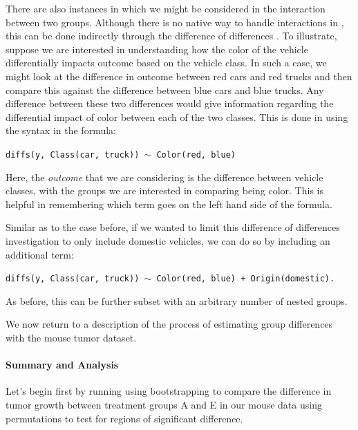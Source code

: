 There are also instances in which we might be considered in the interaction between two groups. Although there is no native way to handle interactions in , this can be done indirectly through the difference of differences \citep{McMurray2019}. To illustrate, suppose we are interested in understanding how the color of the vehicle differentially impacts outcome based on the vehicle class. In such a case, we might look at the difference in outcome between red cars and red trucks and then compare this against the difference between blue cars and blue trucks. Any difference between these two differences would give information regarding the differential impact of color between each of the two classes. This is done in  using the  syntax in the formula:


\begin{center}
\tt diffs(y, Class(car, truck)) $\sim$ Color(red, blue)
\end{center}

Here, the \textit{outcome} that we are considering is the difference between vehicle classes, with the groups we are interested in comparing being color. This is helpful in remembering which term goes on the left hand side of the formula. 

Similar as to the case before, if we wanted to limit this difference of differences investigation to only include domestic vehicles, we can do so by including an additional term:

\begin{center}
\tt diffs(y, Class(car, truck)) $\sim$ Color(red, blue) + Origin(domestic).
\end{center}

As before, this can be further subset with an arbitrary number of nested groups.

We now return to a description of the process of estimating group differences with the mouse tumor dataset.


\paragraph{Summary and Analysis}

Let's begin first by running  using bootstrapping to compare the difference in tumor growth between treatment groups A and E in our mouse data using permutations to test for regions of significant difference. 


